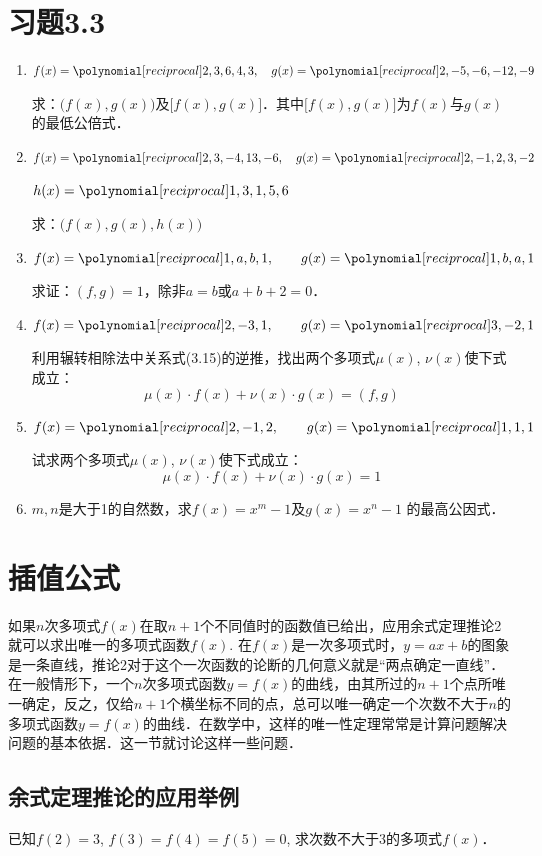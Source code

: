 \section*{习题3.3}

\begin{enumerate}
    \item $f(x)=\poly{2,3,6,4,3},\quad g(x)=\poly{2,-5,-6,-12,-9}$

求：$\bigl(f(x),g(x)\bigr)$及$\bigl[f(x),g(x)\bigr]$．其中$\bigl[f(x),g(x)\bigr]$为$f(x)$与$g(x)$的最低公倍式．

\item $f(x)=\poly{2,3,-4,13,-6},\quad g(x)=\poly{2,-1,2,3,-2}$

$h(x)=\poly{1,3,1,5,6}$

求：$\bigl(f(x),g(x),h(x)\bigr)$

\item $f(x)=\poly{1,a,b,1},\qquad g(x)=\poly{1,b,a,1}$

求证：$(f,g)=1$，除非$a=b$或$a+b+2=0$．
\item $f(x)=\poly{2,-3,1},\qquad g(x)=\poly{3,-2,1}$

利用辗转相除法中关系式(3.15)的逆推，找出两个多项式$\mu(x)$, $\nu(x)$使下式成立：
\[\mu(x)\cdot f(x)+\nu(x)\cdot g(x)=(f,g)\]

\item $f(x)=\poly{2,-1,2},\qquad g(x)=\poly{1,1,1}$

试求两个多项式$\mu(x)$, $\nu(x)$使下式成立：
\[\mu(x)\cdot f(x)+\nu(x)\cdot g(x)=1\]

\item $m,n$是大于1的自然数，求$f(x)=x^m-1$及$g(x)=x^n-1$
的最高公因式．
\end{enumerate}


\section{插值公式}
如果$n$次多项式$f(x)$在取$n+1$个不同值时的函数值已给出，应用余式定理推论2就可以求出唯一的多项式函数$f(x)$. 在$f(x)$是一次多项式时，$y=ax+b$的图象是一条直线，推论2对于这个一次函数的论断的几何意义就是“两点确定一直线”．在一般情形下，一个$n$次多项式函数$y=f(x)$的曲线，由其所过的$n+1$个点所唯一确定，反之，仅给$n+1$个横坐标不同的点，总可以唯一确定一个次数不大于$n$的多项式函数$y=f(x)$的曲线．在数学中，这样的唯一性定理常常是计算问题解决问题的基本依据．这一节就讨论这样一些问题．

\subsection{余式定理推论的应用举例}
\begin{example}
    已知$f(2)=3$, $f(3)=f(4)=f(5)=0$, 求次数不大于3的多项式$f(x)$．
\end{example}

